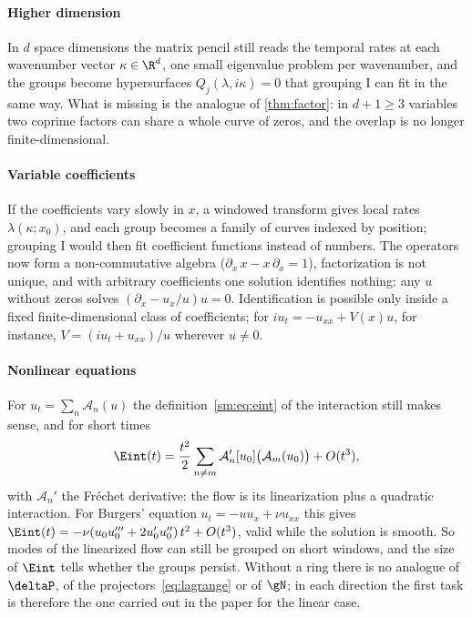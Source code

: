 \paragraph{Higher dimension} In $d$ space dimensions the matrix pencil still reads the temporal rates at each wavenumber
vector $\kappa\in\R^d$, one small eigenvalue problem per wavenumber, and the groups become hypersurfaces
$Q_j(\lambda,i\kappa)=0$ that grouping I can fit in the same way. What is missing is the analogue of
\cref{thm:factor}: in $d+1\ge3$ variables two coprime factors can share a whole curve of zeros, and the overlap is no
longer finite-dimensional.

\paragraph{Variable coefficients} If the coefficients vary slowly in $x$, a windowed transform gives local rates
$\lambda(\kappa;x_0)$, and each group becomes a family of curves indexed by position; grouping I would then fit
coefficient functions instead of numbers. The operators now form a non-commutative algebra ($\partial_x\,x-x\,\partial_x=1$),
factorization is not unique, and with arbitrary coefficients one solution identifies nothing: any $u$ without zeros solves
$(\partial_x-u_x/u)u=0$. Identification is possible only inside a fixed finite-dimensional class of coefficients; for
$iu_t=-u_{xx}+V(x)u$, for instance, $V=(iu_t+u_{xx})/u$ wherever $u\neq0$.

\paragraph{Nonlinear equations} For $u_t=\sum_n\mathcal A_n(u)$ the definition~\eqref{sm:eq:eint} of the interaction still
makes sense, and for short times
\[
  \Eint(t)=\frac{t^2}{2}\sum_{n\neq m}\mathcal A_n'[u_0]\big(\mathcal A_m(u_0)\big)+O(t^3),
\]
with $\mathcal A_n'$ the Fr\'echet derivative: the flow is its linearization plus a quadratic interaction. For Burgers'
equation $u_t=-uu_x+\nu u_{xx}$ this gives $\Eint(t)=-\nu(u_0u_0'''+2u_0'u_0'')\,t^2+O(t^3)$, valid while the solution is
smooth. So modes of the linearized flow can still be grouped on short windows, and the size of $\Eint$ tells whether the
groups persist. Without a ring there is no analogue of $\deltaP$, of the projectors~\eqref{eq:lagrange} or of $\gN$; in
each direction the first task is therefore the one carried out in the paper for the linear case.

